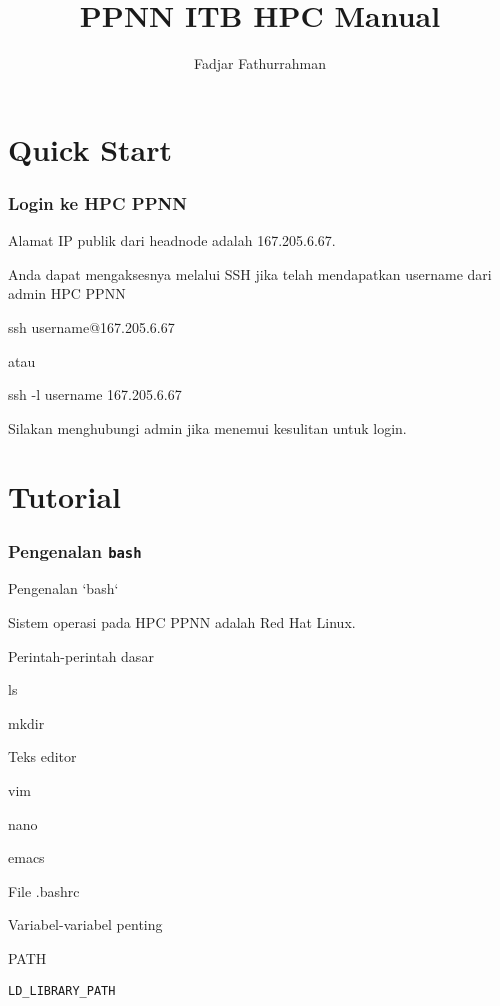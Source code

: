 \documentclass[a4paper,10pt,bahasa]{paper}
\begin{document}
\title{PPNN ITB HPC Manual}
\author{Fadjar Fathurrahman}
\maketitle

\tableofcontents

\part{Quick Start}

\section{Login ke HPC PPNN}

Alamat IP publik dari headnode adalah 167.205.6.67.

Anda dapat mengaksesnya melalui SSH jika telah mendapatkan username
dari admin HPC PPNN

\begin{textcode}
ssh username@167.205.6.67
\end{textcode}

atau

\begin{textcode}
ssh -l username 167.205.6.67
\end{textcode}

Silakan menghubungi admin jika menemui kesulitan untuk login.

\part{Tutorial}

\section{Pengenalan \texttt{bash}}

Pengenalan `bash`

Sistem operasi pada HPC PPNN adalah Red Hat Linux.

Perintah-perintah dasar

ls

mkdir

Teks editor

vim

nano

emacs

File .bashrc

Variabel-variabel penting

PATH

\verb|LD_LIBRARY_PATH|
\end{document}
